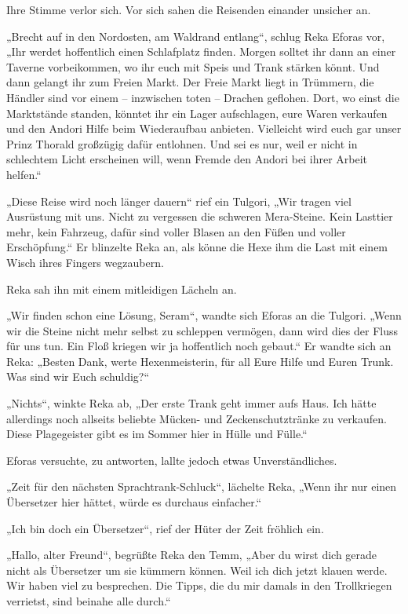 Ihre Stimme verlor sich. Vor sich sahen die Reisenden einander unsicher an.

„Brecht auf in den Nordosten, am Waldrand entlang“, schlug Reka Eforas vor, „Ihr werdet hoffentlich einen Schlafplatz finden. Morgen solltet ihr dann an einer Taverne vorbeikommen, wo ihr euch mit Speis und Trank stärken könnt. Und dann gelangt ihr zum Freien Markt. Der Freie Markt liegt in Trümmern, die Händler sind vor einem – inzwischen toten – Drachen geflohen. Dort, wo einst die Marktstände standen, könntet ihr ein Lager aufschlagen, eure Waren verkaufen und den Andori Hilfe beim Wiederaufbau anbieten. Vielleicht wird euch gar unser Prinz Thorald großzügig dafür entlohnen. Und sei es nur, weil er nicht in schlechtem Licht erscheinen will, wenn Fremde den Andori bei ihrer Arbeit helfen.“

„Diese Reise wird noch länger dauern“ rief ein Tulgori, „Wir tragen viel Ausrüstung mit uns. Nicht zu vergessen die schweren Mera-Steine. Kein Lasttier mehr, kein Fahrzeug, dafür sind voller Blasen an den Füßen und voller Erschöpfung.“ Er blinzelte Reka an, als könne die Hexe ihm die Last mit einem Wisch ihres Fingers wegzaubern.

Reka sah ihn mit einem mitleidigen Lächeln an.

„Wir finden schon eine Lösung, Seram“, wandte sich Eforas an die Tulgori. „Wenn wir die Steine nicht mehr selbst zu schleppen vermögen, dann wird dies der Fluss für uns tun. Ein Floß kriegen wir ja hoffentlich noch gebaut.“ Er wandte sich an Reka: „Besten Dank, werte Hexenmeisterin, für all Eure Hilfe und Euren Trunk. Was sind wir Euch schuldig?“

„Nichts“, winkte Reka ab, „Der erste Trank geht immer aufs Haus. Ich hätte allerdings noch allseits beliebte Mücken- und Zeckenschutztränke zu verkaufen. Diese Plagegeister gibt es im Sommer hier in Hülle und Fülle.“

Eforas versuchte, zu antworten, lallte jedoch etwas Unverständliches.

„Zeit für den nächsten Sprachtrank-Schluck“, lächelte Reka, „Wenn ihr nur einen Übersetzer hier hättet, würde es durchaus einfacher.“

„Ich bin doch ein Übersetzer“, rief der Hüter der Zeit fröhlich ein.

„Hallo, alter Freund“, begrüßte Reka den Temm, „Aber du wirst dich gerade nicht als Übersetzer um sie kümmern können. Weil ich dich jetzt klauen werde. Wir haben viel zu besprechen. Die Tipps, die du mir damals in den Trollkriegen verrietst, sind beinahe alle durch.“

